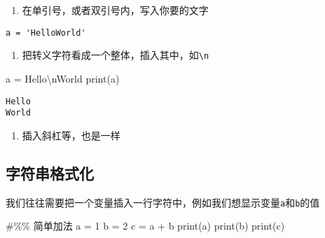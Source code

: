 \documentclass[
  letterpaper,
  DIV=11,
  numbers=noendperiod]{scrreprt}
\newenvironment{Shaded}{\begin{snugshade}}{\end{snugshade}}
\newcommand{\BuiltInTok}[1]{\textcolor[rgb]{0.00,0.23,0.31}{#1}}
\newcommand{\CharTok}[1]{\textcolor[rgb]{0.13,0.47,0.30}{#1}}
\newcommand{\CommentTok}[1]{\textcolor[rgb]{0.37,0.37,0.37}{#1}}
\newcommand{\DecValTok}[1]{\textcolor[rgb]{0.68,0.00,0.00}{#1}}
\newcommand{\NormalTok}[1]{\textcolor[rgb]{0.00,0.23,0.31}{#1}}
\newcommand{\OperatorTok}[1]{\textcolor[rgb]{0.37,0.37,0.37}{#1}}
\newcommand{\StringTok}[1]{\textcolor[rgb]{0.13,0.47,0.30}{#1}}
\providecommand{\tightlist}{%
  \setlength{\itemsep}{0pt}\setlength{\parskip}{0pt}}\usepackage{longtable,booktabs,array}
\begin{document}
\begin{enumerate}
\def\labelenumi{\arabic{enumi}.}
\setcounter{enumi}{1}
\tightlist
\item
  在单引号，或者双引号内，写入你要的文字
\end{enumerate}

\begin{verbatim}
a = 'HelloWorld'
\end{verbatim}

\begin{enumerate}
\def\labelenumi{\arabic{enumi}.}
\setcounter{enumi}{2}
\tightlist
\item
  把转义字符看成一个整体，插入其中，如\texttt{\textbackslash{}n}
\end{enumerate}

\begin{Shaded}
\begin{Highlighting}[]
\NormalTok{a }\OperatorTok{=} \StringTok{\textquotesingle{}Hello}\CharTok{\textbackslash{}n}\StringTok{World\textquotesingle{}}
\BuiltInTok{print}\NormalTok{(a)}
\end{Highlighting}
\end{Shaded}

\begin{verbatim}
Hello
World
\end{verbatim}

\begin{enumerate}
\def\labelenumi{\arabic{enumi}.}
\setcounter{enumi}{3}
\tightlist
\item
  插入斜杠等，也是一样
\end{enumerate}

\hypertarget{ux5b57ux7b26ux4e32ux683cux5f0fux5316}{%
\subsection{字符串格式化}\label{ux5b57ux7b26ux4e32ux683cux5f0fux5316}}

我们往往需要把一个变量插入一行字符中，例如我们想显示变量\texttt{a}和\texttt{b}的值

\begin{Shaded}
\begin{Highlighting}[]
\CommentTok{\#\%\% 简单加法}
\NormalTok{a }\OperatorTok{=} \DecValTok{1}
\NormalTok{b }\OperatorTok{=} \DecValTok{2}
\NormalTok{c }\OperatorTok{=}\NormalTok{ a }\OperatorTok{+}\NormalTok{ b}
\BuiltInTok{print}\NormalTok{(a)}
\BuiltInTok{print}\NormalTok{(b)}
\BuiltInTok{print}\NormalTok{(c)}
\end{Highlighting}
\end{Shaded}
\end{document}
